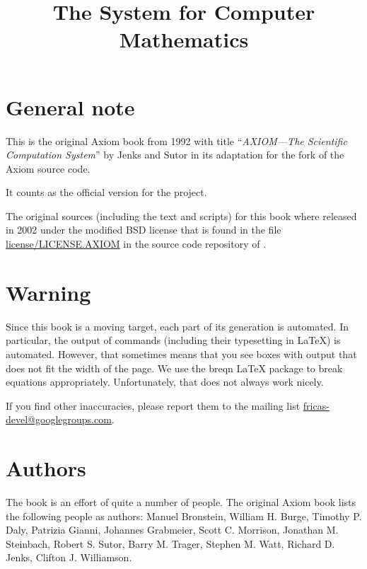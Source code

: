 \documentclass[twoside,a4paper]{book}
\title{The \Language{} System for Computer Mathematics}
\begin{document}
\maketitle
{}%
\setcounter{page}{0}


\section*{General note}
This is the original Axiom book from 1992 with title %
``\emph{AXIOM---The Scientific Computation System}'' by Jenks and
Sutor in its adaptation for the \Language{} fork of the Axiom source
code.

It counts as the official version for the \Language{} project.

The original sources (including the text and scripts) for this book
where released in 2002 under the modified BSD license that is found in
the file
\href{https://github.com/fricas/fricas/blob/master/license/LICENSE.AXIOM}{license/LICENSE.AXIOM}
in the source code repository of \Language{}.


\section*{Warning}
Since this book is a moving target, each part of its generation is
automated. In particular, the output of \Language{} commands
(including their typesetting in \LaTeX{}) is automated. However, that
sometimes means that you see boxes with output that does not fit the
width of the page. We use the breqn \LaTeX{} package to break
equations appropriately. Unfortunately, that does not always work
nicely.

If you find other inaccuracies, please report them to the mailing list
\href{mailto:fricas-devel@googlegroups.com}{fricas-devel@googlegroups.com}.

\section*{Authors}

The book is an effort of quite a number of people.
%
The original Axiom book lists the following people as authors:
Manuel Bronstein,
William H. Burge,
Timothy P. Daly,
Patrizia Gianni,
Johannes Grabmeier,
Scott C. Morrison,
Jonathan M. Steinbach,
Robert S. Sutor,
Barry M. Trager,
Stephen M. Watt,
Richard D. Jenks,
Clifton J. Williamson.
\end{document}
